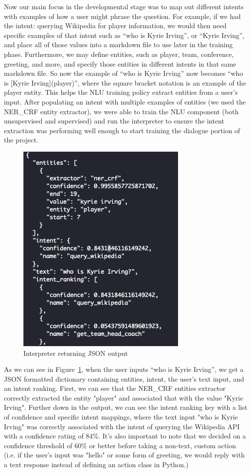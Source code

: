 \documentclass[conference]{IEEEtran}
\begin{document}
Now our main focus in the developmental stage was to map out different intents with examples of how a user might phrase the question. For example, if we had the intent: querying Wikipedia for player information, we would then need specific examples of that intent such as “who is Kyrie Irving”, or “Kyrie Irving”, and place all of those values into a markdown file to use later in the training phase. Furthermore, we may define entities, such as player, team, conference, greeting, and more, and specify those entities in different intents in that same markdown file. So now the example of “who is Kyrie Irving” now becomes “who is [Kyrie Irving](player)”, where the square bracket notation is an example of the player entity. This helps the NLU training policy extract entities from a user's input. After populating an intent with multiple examples of entities (we used the NER\_CRF entity extractor), we were able to train the NLU component (both unsupervised and supervised) and run the interpreter to ensure the intent extraction was performing well enough to start training the dialogue portion of the project. 

\begin{figure}
	\includegraphics[scale=0.50]{nlu_example.png}
	\caption{ Interpreter returning JSON output }
	\label{fig:ex2}
\end{figure}

As we can see in Figure~\ref{fig:ex2}, when the user inputs “who is Kyrie Irving”, we get a JSON formatted dictionary containing entities, intent, the user's text input, and an intent ranking. First, we can see that the NER\_CRF entities extractor correctly extracted the entity "player" and associated that with the value "Kyrie Irving". Further down in the output, we can see the intent ranking key with a list of confidence and specific intent mappings, where the text input "who is Kyrie Irving" was correctly associated with the intent of querying the Wikipedia API with a confidence rating of 84\%. It's also important to note that we decided on a confidence threshold of 60\% or better before taking a non-text, custom action (i.e. if the user's input was "hello" or some form of greeting, we would reply with a text response instead of defining an action class in Python.)
\end{document}
